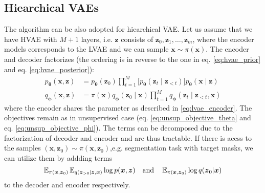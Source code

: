 \subsection{Hiearchical VAEs}
The algorithm can be also adopted for hiearchical VAE. Let us assume that we have HVAE with $M+1$ layers, i.e. $\boldsymbol{z}$ consists of 
$\boldsymbol{z}_0,\boldsymbol{z}_1,\dots,\boldsymbol{z}_m$, where the encoder models corresponds to the LVAE and we can sample $\boldsymbol{x} \sim \pi(\boldsymbol{x})$.
The encoder and decoder factorizes (the ordering is in reverse to the one in eq. \ref{eq:hvae_prior} and eq. \ref{eq:hvae_posterior}):
\begin{align*}
    p_{\boldsymbol{\theta}}(\boldsymbol{x},\boldsymbol{z})&=p_{\boldsymbol{\theta}}(\boldsymbol{z}_{0}) \prod_{t=1}^{M}\bigl[p_{\boldsymbol{\theta}}(\boldsymbol{z}_{t}\mid\boldsymbol{z}_{<t}) \bigr]  p_{\boldsymbol{\theta}}(\boldsymbol{x}\mid\boldsymbol{z})  \\
    q_{\boldsymbol{\phi}}(\boldsymbol{x},\boldsymbol{z}) &=\pi(\boldsymbol{x})q_{\boldsymbol{\phi}}(\boldsymbol{z}_{0}\mid\boldsymbol{x}) \prod_{t=1}^{M}  q_{\boldsymbol{\phi}}(\boldsymbol{z}_{t}\mid\boldsymbol{z}_{<t},\boldsymbol{x}) 
\end{align*}
where the encoder shares the parameter as described in \ref{eq:lvae_encoder}. The objectives remain as in unsupervised case (eq. \ref{eq:unsup_objective_theta} and eq. \ref{eq:unsup_objective_phi}).
The terms can be decomposed due to the factorization of decoder and encoder and are thus tractable.  If there is 
acess to the samples $(\boldsymbol{x},\boldsymbol{z}_0) \sim \pi(\boldsymbol{x},\boldsymbol{z}_0)$,e.g. segmentation task with target masks, we can utilize them 
by addding terms
$$
\operatorname{\mathbb{E}}_{\pi(\boldsymbol{x},\boldsymbol{z}_0)}\operatorname{\mathbb{E}}_{q(\boldsymbol{z}_{>0} |\boldsymbol{z},\boldsymbol{x})} \log p(\boldsymbol{x},\boldsymbol{z}) 
\quad\text{and}\quad
\operatorname{\mathbb{E}}_{\pi(\boldsymbol{x},\boldsymbol{z}_0)} \log q(\boldsymbol{z}_0|\boldsymbol{x})
$$
to the decoder and encoder respectively. 








